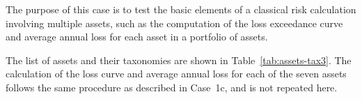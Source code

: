 The purpose of this case is to test the basic elements of a classical risk calculation involving multiple assets, such as the computation of the loss exceedance curve and average annual loss for each asset in a portfolio of assets.

The list of assets and their taxonomies are shown in Table~\ref{tab:assets-tax3}. The calculation of the loss curve and average annual loss for each of the seven assets follows the same procedure as described in Case~1c, and is not repeated here.
